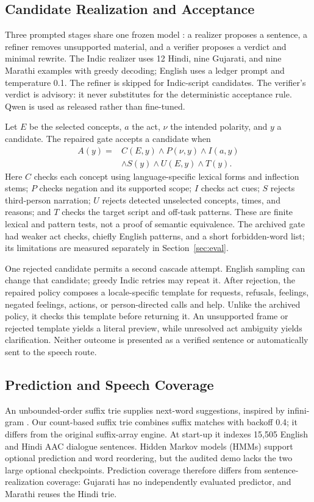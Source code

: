 \subsection{Candidate Realization and Acceptance}
Three prompted stages share one frozen \emph{\qwen{}} model \citep{qwen05card}: a realizer proposes a sentence, a refiner removes unsupported material, and a verifier proposes a verdict and minimal rewrite.
The Indic realizer uses 12 Hindi, nine Gujarati, and nine Marathi examples with greedy decoding; English uses a ledger prompt and temperature 0.1.
The refiner is skipped for Indic-script candidates.
The verifier's verdict is advisory: it never substitutes for the deterministic acceptance rule.
Qwen is used as released rather than fine-tuned.

Let $E$ be the selected concepts, $a$ the act, $\nu$ the intended polarity, and $y$ a candidate.
The repaired gate accepts a candidate when
\begin{equation}
\begin{split}
A(y)={}&C(E,y)\wedge P(\nu,y)\wedge I(a,y)\\
&\wedge S(y)\wedge U(E,y)\wedge T(y).
\end{split}
\label{eq:gate}
\end{equation}
Here $C$ checks each concept using language-specific lexical forms and inflection stems; $P$ checks negation and its supported scope; $I$ checks act cues; $S$ rejects third-person narration; $U$ rejects detected unselected concepts, times, and reasons; and $T$ checks the target script and off-task patterns.
These are finite lexical and pattern tests, not a proof of semantic equivalence.
The archived gate had weaker act checks, chiefly English patterns, and a short forbidden-word list; its limitations are measured separately in Section~\ref{sec:eval}.

One rejected candidate permits a second cascade attempt.
English sampling can change that candidate; greedy Indic retries may repeat it.
After rejection, the repaired policy composes a locale-specific template for requests, refusals, feelings, negated feelings, actions, or person-directed calls and help.
Unlike the archived policy, it checks this template before returning it.
An unsupported frame or rejected template yields a literal preview, while unresolved act ambiguity yields clarification.
Neither outcome is presented as a verified sentence or automatically sent to the speech route.

\subsection{Prediction and Speech Coverage}
An unbounded-order suffix trie supplies next-word suggestions, inspired by infini-gram \citep{liu2024infinigram}.
Our count-based suffix trie combines suffix matches with backoff 0.4; it differs from the original suffix-array engine.
At start-up it indexes 15,505 English and Hindi AAC dialogue sentences.
Hidden Markov models (HMMs) support optional prediction and word reordering, but the audited demo lacks the two large optional checkpoints.
Prediction coverage therefore differs from sentence-realization coverage: Gujarati has no independently evaluated predictor, and Marathi reuses the Hindi trie.

